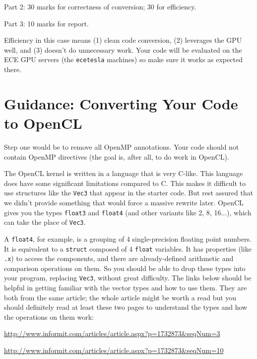\documentclass[letterpaper,10pt]{article}
\begin{document}
Part 2: 30 marks for correctness of conversion; 30 for efficiency.

Part 3: 10 marks for report.

Efficiency in this case means (1) clean code conversion, (2) leverages the GPU well, and (3) doesn't do unnecessary work. Your code will be evaluated on the ECE GPU servers (the \texttt{ecetesla} machines) so make sure it works as expected there. 


\newpage
\section*{Guidance: Converting Your Code to OpenCL}

Step one would be to remove all OpenMP annotations. Your code should not contain
OpenMP directives (the goal is, after all, to do work in OpenCL).

The OpenCL kernel is written in a language that is very C-like. This language does have some
significant limitations compared to C. This makes it difficult to use 
structures like the \texttt{Vec3} that appear in the starter code. But rest 
assured that we didn't provide something that would force a massive 
rewrite later. OpenCL gives you the types \texttt{float3} and \texttt{float4} (and other variants like 2, 8, 16...), which can take the place of \texttt{Vec3}.

A \texttt{float4}, for example, is a grouping of 4 single-precision floating point numbers. It is
equivalent to a \texttt{struct} composed of 4 \texttt{float} variables. It has
properties (like \texttt{.x}) to access the components, and there are
already-defined arithmetic and comparison operations on them. So you should be able to drop
these types into your program, replacing \texttt{Vec3}, without great difficulty.
The links below should be helpful in getting familiar with the vector types and how 
to use them. They are both from the same article; the whole article might be worth a 
read but you should definitely read at least these two pages to understand the 
types and how the operations on them work:

\begin{center}

\url{http://www.informit.com/articles/article.aspx?p=1732873&seqNum=3}

\url{http://www.informit.com/articles/article.aspx?p=1732873&seqNum=10}

\end{center}
\end{document}
